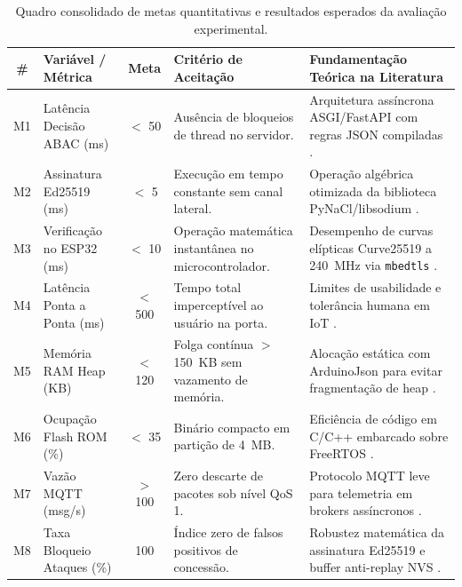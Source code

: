 \begin{table}[htbp]
\centering
\footnotesize
\caption{Quadro consolidado de metas quantitativas e resultados esperados da avaliação experimental.}
\label{quadro:resultados-experimentais}
\begin{tabularx}{\textwidth}{c p{3.6cm} c p{3.2cm} X}
\toprule
\textbf{\#} & \textbf{Variável / Métrica} & \textbf{Meta} & \textbf{Critério de Aceitação} & \textbf{Fundamentação Teórica na Literatura} \\
\midrule
M1 & Latência Decisão ABAC (ms) & $<$ 50 & Ausência de bloqueios de thread no servidor. & Arquitetura assíncrona ASGI/FastAPI com regras JSON compiladas \cite{ameer2022}. \\
\addlinespace
M2 & Assinatura Ed25519 (ms) & $<$ 5 & Execução em tempo constante sem canal lateral. & Operação algébrica otimizada da biblioteca PyNaCl/libsodium \cite{hanblockchainoffline2018}. \\
\addlinespace
M3 & Verificação no ESP32 (ms) & $<$ 10 & Operação matemática instantânea no microcontrolador. & Desempenho de curvas elípticas Curve25519 a 240~MHz via \texttt{mbedtls} \cite{simperf2024}. \\
\addlinespace
M4 & Latência Ponta a Ponta (ms) & $<$ 500 & Tempo total imperceptível ao usuário na porta. & Limites de usabilidade e tolerância humana em IoT \cite{satanasaowapak2021}. \\
\addlinespace
M5 & Memória RAM Heap (KB) & $<$ 120 & Folga contínua $>$ 150~KB sem vazamento de memória. & Alocação estática com ArduinoJson para evitar fragmentação de heap \cite{vardakis2024}. \\
\addlinespace
M6 & Ocupação Flash ROM (\%) & $<$ 35 & Binário compacto em partição de 4~MB. & Eficiência de código em C/C++ embarcado sobre FreeRTOS \cite{simperf2024}. \\
\addlinespace
M7 & Vazão MQTT (msg/s) & $>$ 100 & Zero descarte de pacotes sob nível QoS 1. & Protocolo MQTT leve para telemetria em brokers assíncronos \cite{ameer2022,shauto2024}. \\
\addlinespace
M8 & Taxa Bloqueio Ataques (\%) & 100 & Índice zero de falsos positivos de concessão. & Robustez matemática da assinatura Ed25519 e buffer anti-replay NVS \cite{satanasaowapak2021}. \\
\bottomrule
\end{tabularx}
\end{table}

